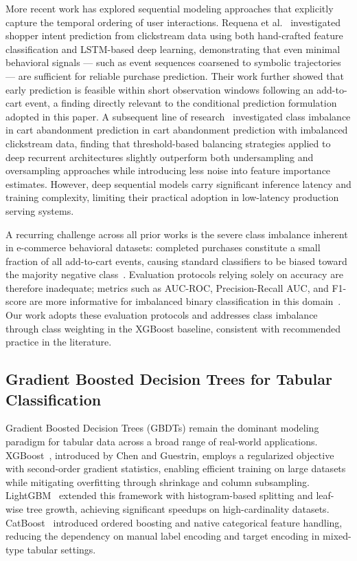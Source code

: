 \documentclass[conference]{IEEEtran}
\begin{document}
More recent work has explored sequential modeling approaches that
explicitly capture the temporal ordering of user interactions. Requena et
al.~\cite{requena2020shopper} investigated shopper intent prediction from
clickstream data using both hand-crafted feature classification and
LSTM-based deep learning, demonstrating that even minimal behavioral
signals --- such as event sequences coarsened to symbolic trajectories
--- are sufficient for reliable purchase prediction. Their work further
showed that early prediction is feasible within short observation windows
following an add-to-cart event, a finding directly relevant to the
conditional prediction formulation adopted in this paper. A subsequent line of research~\cite{japkowicz2002class,besaleva2014classification} 
investigated class imbalance in cart abandonment prediction
in cart abandonment prediction with imbalanced clickstream data, finding
that threshold-based balancing strategies applied to deep recurrent
architectures slightly outperform both undersampling and oversampling
approaches while introducing less noise into feature importance
estimates. However, deep sequential models carry significant inference
latency and training complexity, limiting their practical adoption in
low-latency production serving systems.

A recurring challenge across all prior works is the severe class
imbalance inherent in e-commerce behavioral datasets: completed purchases
constitute a small fraction of all add-to-cart events, causing standard
classifiers to be biased toward the majority negative
class~\cite{besaleva2014classification}. Evaluation protocols relying
solely on accuracy are therefore inadequate; metrics such as AUC-ROC,
Precision-Recall AUC, and F1-score are more informative for imbalanced
binary classification in this domain~\cite{japkowicz2002class}. Our work
adopts these evaluation protocols and addresses class imbalance through
class weighting in the XGBoost baseline, consistent with recommended
practice in the literature.

\subsection{Gradient Boosted Decision Trees for Tabular Classification}

Gradient Boosted Decision Trees (GBDTs) remain the dominant modeling
paradigm for tabular data across a broad range of real-world
applications. XGBoost~\cite{chen2016xgboost}, introduced by Chen and
Guestrin, employs a regularized objective with second-order gradient
statistics, enabling efficient training on large datasets while
mitigating overfitting through shrinkage and column subsampling.
LightGBM~\cite{ke2017lightgbm} extended this framework with
histogram-based splitting and leaf-wise tree growth, achieving
significant speedups on high-cardinality datasets.
CatBoost~\cite{prokhorenkova2018catboost} introduced ordered boosting and
native categorical feature handling, reducing the dependency on manual
label encoding and target encoding in mixed-type tabular settings.
\end{document}
